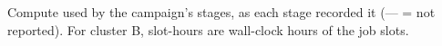 \begin{table}[H]
\centering
\caption{Compute used by the campaign's stages, as each stage recorded it (--- = not
reported). For cluster B, slot-hours are wall-clock hours of the job slots.}
\label{tab:app_camp_compute}
\campfit{\small}
\end{table}

% 

% 
